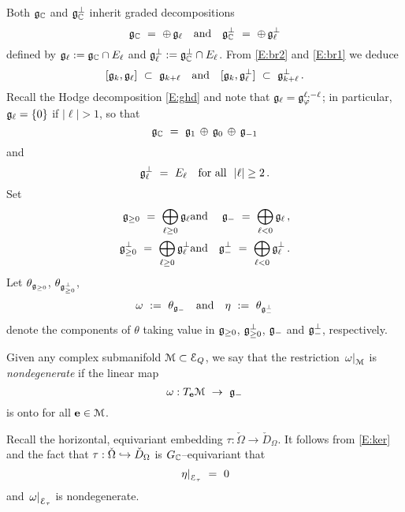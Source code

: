 \documentclass[12pt]{amsart}
\numberwithin{equation}{section}
\numberwithin{table}{section}
\numberwithin{figure}{section}
\begin{document}
Both ${\mathfrak{g}}_\mathbb C$ and ${\mathfrak{g}}_\mathbb C^\perp$ inherit graded decompositions
\begin{equation} \label{E:grd}
  \fg_\bC \ = \ \op\,\fg_\ell \tand \fg_\bC^\perp \ = \ \op\,\fg_\ell^\perp
\end{equation}
defined by ${\mathfrak{g}}_\ell := {\mathfrak{g}}_\mathbb C \cap E_\ell$ and ${\mathfrak{g}}_\ell^\perp := {\mathfrak{g}}_\mathbb C^\perp \cap E_\ell$.  From \eqref{E:br2} and \eqref{E:br1} we deduce
\begin{equation} \label{E:br3}
  [ {\mathfrak{g}}_k , {\mathfrak{g}}_\ell] \ \subset \ {\mathfrak{g}}_{k+\ell} \quad\hbox{and}\quad 
  [ {\mathfrak{g}}_k , {\mathfrak{g}}_\ell^\perp ] \ \subset \ {\mathfrak{g}}_{k+\ell}^\perp \,.
\end{equation}
Recall the Hodge decomposition \eqref{E:ghd} and note that ${\mathfrak{g}}_\ell = {\mathfrak{g}}^{\ell,-\ell}_\varphi$; in particular, ${\mathfrak{g}}_\ell = \{0\}$ if $|\ell| > 1$, so that 
\begin{equation}\label{E:gell}
  {\mathfrak{g}}_\mathbb C \ = \ {\mathfrak{g}}_1 \,\oplus\,{\mathfrak{g}}_0 \,\oplus\, {\mathfrak{g}}_{-1} 
\end{equation}
and 
\begin{equation}\label{E:gperpell}
  {\mathfrak{g}}_\ell^\perp \ = \ E_\ell \quad \hbox{for all } \ |\ell| \ge 2 \,.
\end{equation}
Set 
\begin{eqnarray*}
  {\mathfrak{g}}_{\ge0} \ = \ \bigoplus_{\ell\ge0} {\mathfrak{g}}_\ell 
  &\hbox{and}& {\mathfrak{g}}_- \ = \ \bigoplus_{\ell < 0} {\mathfrak{g}}_\ell\,,\\
  {\mathfrak{g}}^\perp_{\ge0} \ = \ \bigoplus_{\ell\ge0} {\mathfrak{g}}^\perp_\ell 
  &\hbox{and}& {\mathfrak{g}}^\perp_- \ = \ \bigoplus_{\ell < 0} {\mathfrak{g}}^\perp_\ell \,.
\end{eqnarray*}
Let $\theta_{{\mathfrak{g}}_{\ge0}}$, $\theta_{{\mathfrak{g}}_{\ge0}^\perp}$, 
\[
  \w \ := \ \theta_{\fg_-} \tand \eta \ := \ \theta_{\fg_-^\perp}
\]
denote the components of $\theta$ taking value in ${\mathfrak{g}}_{\ge0}$, ${\mathfrak{g}}_{\ge0}^\perp$, ${\mathfrak{g}}_-$ and ${\mathfrak{g}}_-^\perp$, respectively.

Given any complex submanifold $\mathcal M \subset \mathcal E_Q$, we say that the restriction $\left.\omega\right|_\mathcal M$ is \emph{nondegenerate} if the linear map
\[
  \omega : T_{\mathbf{e}} \mathcal M \ \to \ {\mathfrak{g}}_-
\]
is onto for all $\mathbf{e} \in \mathcal M$.  

\begin{example} \label{eg:tau}
Recall the horizontal, equivariant embedding $\tau : \check \Omega \to \check D_\Omega$.  It follows from \eqref{E:ker} and the fact that $\tau : \check \Omega \hookrightarrow \check D_\Omega$ is $G_\mathbb C$--equivariant that
\[
  \left. \eta \right|_{\mathcal E_\tau} \ = \ 0
\]
and $\left.\omega\right|_{\mathcal E_\tau}$ is nondegenerate.
\end{example}
\end{document}
